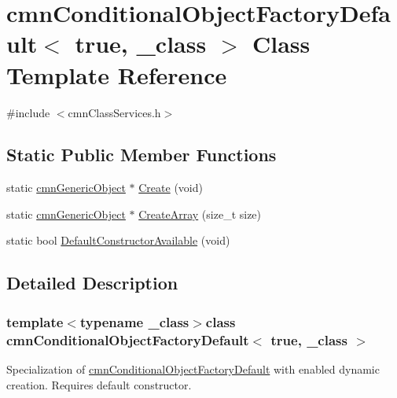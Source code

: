 \hypertarget{classcmn_conditional_object_factory_default_3_01true_00_01__class_01_4}{\section{cmn\-Conditional\-Object\-Factory\-Default$<$ true, \-\_\-class $>$ Class Template Reference}
\label{classcmn_conditional_object_factory_default_3_01true_00_01__class_01_4}
}


{\ttfamily \#include $<$cmn\-Class\-Services.\-h$>$}

\subsection*{Static Public Member Functions}
\begin{DoxyCompactItemize}
\item 
static \hyperlink{classcmn_generic_object}{cmn\-Generic\-Object} $\ast$ \hyperlink{classcmn_conditional_object_factory_default_3_01true_00_01__class_01_4_ad41c2a658391f398de6d261b562206ef}{Create} (void)
\item 
static \hyperlink{classcmn_generic_object}{cmn\-Generic\-Object} $\ast$ \hyperlink{classcmn_conditional_object_factory_default_3_01true_00_01__class_01_4_af3901746f7aaf60dd183e9a0e7d8875c}{Create\-Array} (size\-\_\-t size)
\item 
static bool \hyperlink{classcmn_conditional_object_factory_default_3_01true_00_01__class_01_4_a02f6196021e94e87afe2ea88b77cb4ce}{Default\-Constructor\-Available} (void)
\end{DoxyCompactItemize}


\subsection{Detailed Description}
\subsubsection*{template$<$typename \-\_\-class$>$class cmn\-Conditional\-Object\-Factory\-Default$<$ true, \-\_\-class $>$}

Specialization of \hyperlink{classcmn_conditional_object_factory_default}{cmn\-Conditional\-Object\-Factory\-Default} with enabled dynamic creation. Requires default constructor. 

